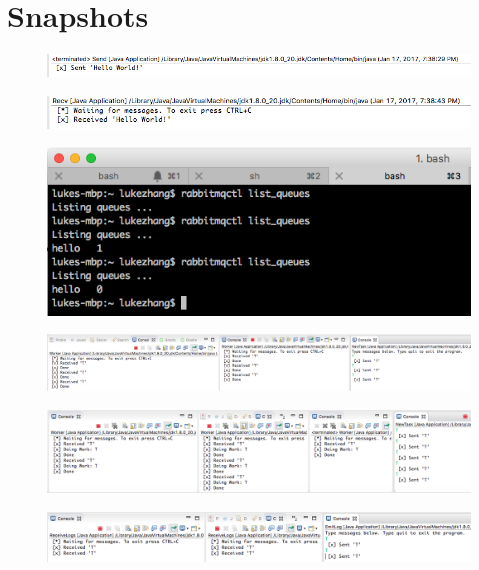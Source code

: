 \documentclass[12pt,letterpaper,boxed]{hmcpset}
\begin{document}
\section*{Snapshots}
\begin{figure}[H]
  \centering
  \includegraphics[width = 1.0\textwidth]{1.png}
\end{figure}
\begin{figure}[H]
  \centering
  \includegraphics[width = 1.0\textwidth]{2.png}
\end{figure}
\begin{figure}[H]
  \centering
  \includegraphics[width = 1.0\textwidth]{3.png}
\end{figure}
\begin{figure}[H]
  \centering
  \includegraphics[width = 1.0\textwidth]{4.png}
\end{figure}
\begin{figure}[H]
  \centering
  \includegraphics[width = 1.0\textwidth]{5.png}
\end{figure}
\begin{figure}[H]
  \centering
  \includegraphics[width = 1.0\textwidth]{6.png}
\end{figure}
\end{document}
